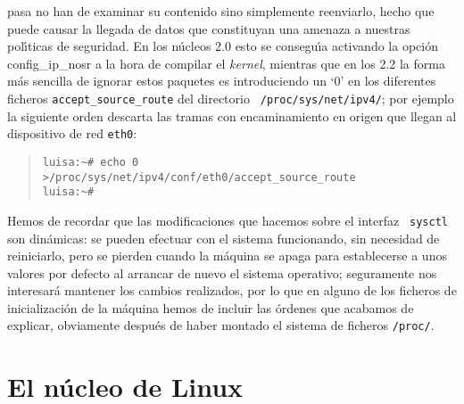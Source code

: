 pasa no han de examinar su contenido sino simplemente reenviarlo, hecho que
puede causar la llegada de datos que constituyan una amenaza a nuestras
pol\'{\i}ticas de seguridad. En los n\'ucleos 2.0 esto se consegu\'{\i}a
activando la opci\'on {\sc config\_ip\_nosr} a la hora de compilar el {\it 
kernel}, mientras que en los 2.2 la forma
m\'as sencilla de ignorar estos paquetes es introduciendo un `0' en los
diferentes ficheros {\tt accept\_source\_route} del directorio {\tt
/proc/sys/net/ipv4/}; por ejemplo la siguiente orden descarta las tramas con
encaminamiento en origen que llegan al dispositivo de red {\tt eth0}:
\begin{quote}
\begin{verbatim}
luisa:~# echo 0 >/proc/sys/net/ipv4/conf/eth0/accept_source_route
luisa:~# 
\end{verbatim}
\end{quote}
Hemos de recordar que las modificaciones que hacemos sobre el interfaz {\tt
sysctl} son din\'amicas: se pueden efectuar con el sistema funcionando, sin
necesidad de reiniciarlo, pero se pierden cuando la m\'aquina se apaga para
establecerse a unos valores por defecto al arrancar de nuevo el sistema
operativo; seguramente nos interesar\'a mantener los cambios realizados, por lo
que en alguno de los ficheros de inicializaci\'on de la m\'aquina hemos de
incluir las \'ordenes que acabamos de explicar, obviamente despu\'es de haber
montado el sistema de ficheros {\tt /proc/}.
\section{El n\'ucleo de Linux}
\label{linkernel}
